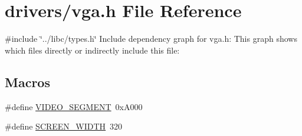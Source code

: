\hypertarget{a00011}{}\section{drivers/vga.h File Reference}
\label{a00011}
{\ttfamily \#include \char`\"{}../libc/types.\+h\char`\"{}}\newline
Include dependency graph for vga.\+h\+:
This graph shows which files directly or indirectly include this file\+:
\subsection*{Macros}
\begin{DoxyCompactItemize}
\item 
\#define \hyperlink{a00011_a818608c80027ef8ff56d31ebaedf58f3_a818608c80027ef8ff56d31ebaedf58f3}{V\+I\+D\+E\+O\+\_\+\+S\+E\+G\+M\+E\+NT}~0x\+A000
\item 
\#define \hyperlink{a00011_a2cd109632a6dcccaa80b43561b1ab700_a2cd109632a6dcccaa80b43561b1ab700}{S\+C\+R\+E\+E\+N\+\_\+\+W\+I\+D\+TH}~320
\end{DoxyCompactItemize}
